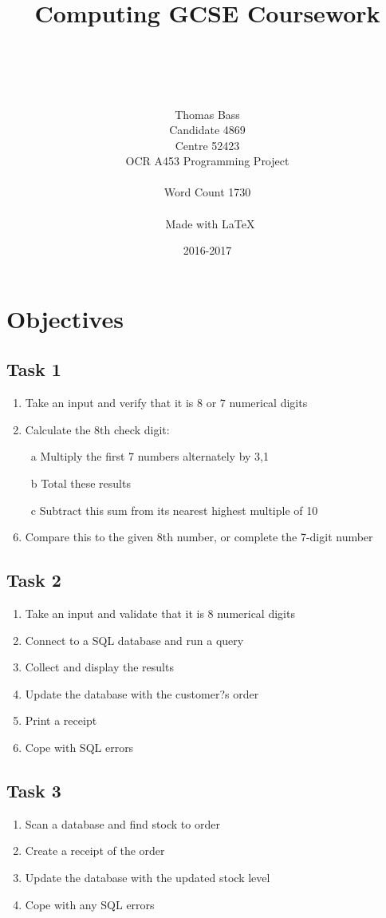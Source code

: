 \documentclass[a4paper]{article}
\title{Computing GCSE Coursework}
\author{\\ \\ \\ \\ Thomas Bass\\Candidate 4869\\Centre 52423\\OCR A453 Programming Project\\\\ Word Count 1730 \\\\\ Made with \LaTeX}
\date{2016-2017}
\begin{document}
\maketitle
\pagebreak
\renewcommand*\contentsname{Summary}
\tableofcontents
\pagebreak
\section{Objectives}

\subsection{Task 1}
\begin{enumerate}
\item{Take an input and verify that it is 8 or 7 numerical digits}
\item{Calculate the 8th check digit:}
\item[~a]{Multiply the first 7 numbers alternately by 3,1}
\item[~b]{Total these results}
\item[~c]{Subtract this sum from its nearest highest multiple of 10}
\item{Compare this to the given 8th number, or complete the 7-digit number}
\end{enumerate}

\subsection{Task 2}
\begin{enumerate}
\item{Take an input and validate that it is 8 numerical digits}
\item{Connect to a SQL database and run a query}
\item{Collect and display the results}
\item{Update the database with the customer?s order}
\item{Print a receipt}
\item{Cope with SQL errors}
\end{enumerate}

\subsection{Task 3}
\begin{enumerate}
\item{Scan a database and find stock to order}
\item{Create a receipt of the order}
\item{Update the database with the updated stock level}
\item{Cope with any SQL errors}
\end{enumerate}
\end{document}
